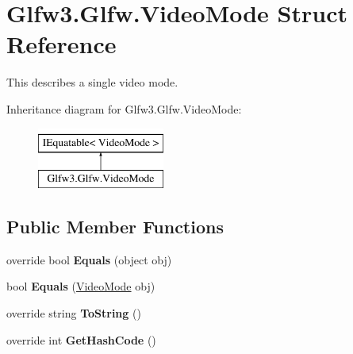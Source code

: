 \hypertarget{struct_glfw3_1_1_glfw_1_1_video_mode}{}\section{Glfw3.\+Glfw.\+Video\+Mode Struct Reference}
\label{struct_glfw3_1_1_glfw_1_1_video_mode}


This describes a single video mode.  


Inheritance diagram for Glfw3.\+Glfw.\+Video\+Mode\+:\begin{figure}[H]
\begin{center}
\leavevmode
\includegraphics[height=2.000000cm]{struct_glfw3_1_1_glfw_1_1_video_mode}
\end{center}
\end{figure}
\subsection*{Public Member Functions}
\begin{DoxyCompactItemize}
\item 
\mbox{\label{struct_glfw3_1_1_glfw_1_1_video_mode_ab017be4f4344971a68cb4ae7ae6467e6}} 
override bool {\bfseries Equals} (object obj)
\item 
\mbox{\label{struct_glfw3_1_1_glfw_1_1_video_mode_a466122c8a3d9c3130af354378459d73a}} 
bool {\bfseries Equals} (\mbox{\hyperlink{struct_glfw3_1_1_glfw_1_1_video_mode}{Video\+Mode}} obj)
\item 
\mbox{\label{struct_glfw3_1_1_glfw_1_1_video_mode_a59862243111fd4f0e18a1325dfb2b716}} 
override string {\bfseries To\+String} ()
\item 
\mbox{\label{struct_glfw3_1_1_glfw_1_1_video_mode_a982798ab11bc4d9af275ab37bf07e5e7}} 
override int {\bfseries Get\+Hash\+Code} ()
\end{DoxyCompactItemize}
